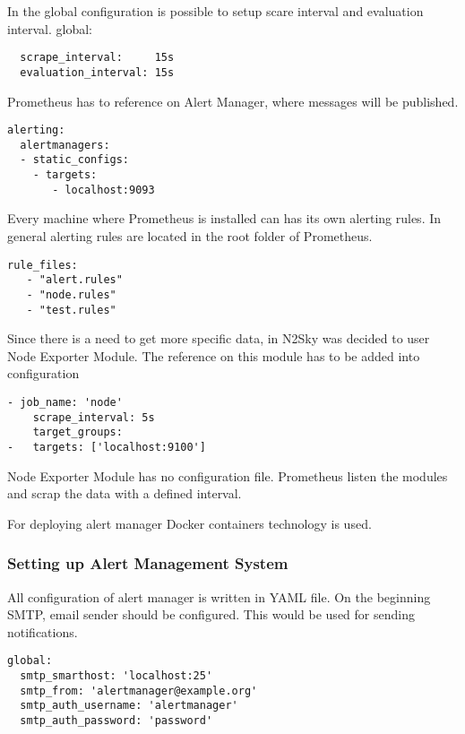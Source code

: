  In the global configuration is possible to setup scare interval and evaluation interval.
global:
 
 \begin{lstlisting}
  scrape_interval:     15s 
  evaluation_interval: 15s 
\end{lstlisting}

Prometheus has to reference on Alert Manager, where messages will be published. 
 \begin{lstlisting}
alerting:
  alertmanagers:
  - static_configs:
    - targets:
       - localhost:9093
\end{lstlisting}

Every machine where Prometheus is installed can has its own alerting rules. In general alerting rules are located in the root folder of Prometheus.

 \begin{lstlisting}
rule_files:
   - "alert.rules"
   - "node.rules"
   - "test.rules"
\end{lstlisting}

Since there is a need to get more specific data, in N2Sky was decided to user Node Exporter Module. The reference on this module has to be added into configuration

 \begin{lstlisting}
- job_name: 'node'
    scrape_interval: 5s
    target_groups:
-	targets: ['localhost:9100']
\end{lstlisting}

Node Exporter Module has no configuration file. Prometheus listen the modules and scrap the data with a defined interval.

For deploying alert manager Docker containers technology is used.

\subsubsection{Setting up Alert Management System}\label{Setting up Alert Management System}

All configuration of alert manager is written in YAML file. 
On the beginning SMTP, email sender should be configured. This would be used for sending notifications.

 \begin{lstlisting}
global:
  smtp_smarthost: 'localhost:25'
  smtp_from: 'alertmanager@example.org'
  smtp_auth_username: 'alertmanager'
  smtp_auth_password: 'password'
\end{lstlisting}

